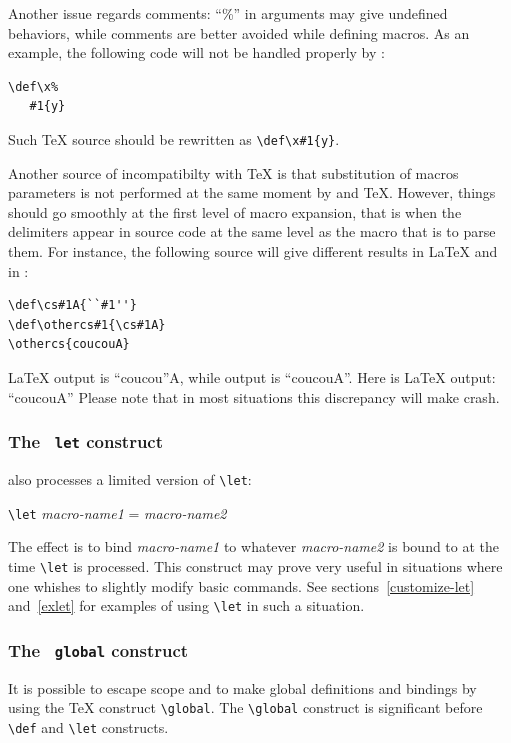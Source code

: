 Another issue regards comments: ``\%'' in arguments may give undefined
behaviors, while comments are better avoided while defining
macros. As an example, the following code will not be handled properly
by \hevea:
\begin{verbatim}
\def\x%
   #1{y}
\end{verbatim}
Such \TeX{} source should be rewritten as \verb+\def\x#1{y}+.


Another source of incompatibilty with \TeX{} is that  substitution of
macros parameters is not performed at the same moment by \hevea{} and
\TeX{}.
However, things should go smoothly at the first level of macro
expansion, that is when the delimiters
appear in source code at the same level as the macro that is to
parse them.
For instance, the following source will give different results in
\LaTeX{} and in \hevea:
\begin{verbatim}
\def\cs#1A{``#1''}
\def\othercs#1{\cs#1A}
\othercs{coucouA}
\end{verbatim}
\LaTeX{} output is ``coucou''A, while \hevea{} output is ``coucouA''.
Here is \ifhevea\hevea\else\LaTeX\fi{} output:
{\def\cs#1A{``#1''}
\def\othercs#1{\cs#1A}
\othercs{coucouA}}
Please note that in most situations this discrepancy will make
\hevea{} crash. 


\subsubsection{The \texttt{ let} construct}
\hevea{} also processes a
limited version of \verb+\let+:
\begin{flushleft}
\verb+\let+ {\it macro-name1} = {\it macro-name2}
\end{flushleft}
The effect is to bind  {\it macro-name1} to whatever {\it macro-name2}
is bound to at the time \verb+\let+ is processed. This construct may
prove very useful in situations where
one whishes to slightly modify basic commands.
See sections~\ref{customize-let} and~\ref{exlet} for examples of using
\verb+\let+ in such a situation.




\subsubsection{The \texttt{ global} construct}
It is possible to escape scope and to make global definitions
and bindings by using the \TeX{} construct \verb+\global+.
The \verb+\global+ construct is significant before
\verb+\def+ and \verb+\let+ constructs.

